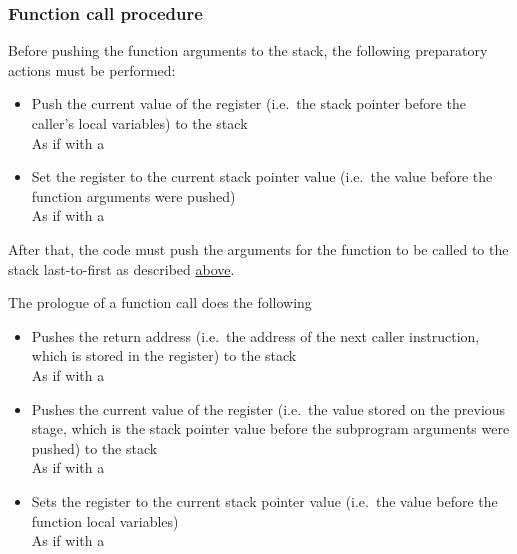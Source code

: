 \hypertarget{functions:call}{
    \subsubsection{Function call procedure}
}

\vspace{-0.2cm}

\hypertarget{functions:prep}{}
Before pushing the function arguments to the stack, the following
preparatory actions must be performed:

\begin{itemize}
    \item Push the current value of the  register
    (i.e.\ the stack pointer before the caller's local variables)
    to the stack \\
    As if with a \hspace{-0.1cm}

    \item Set the  register to the current stack pointer value
    (i.e.\ the value before the function arguments were pushed)\\
    As if with a \hspace{-0.1cm}
\end{itemize}

After that, the code must push the arguments for the function to be called
to the stack last-to-first as described \hyperlink{karma:call:basic}{above}.

\hypertarget{functions:prologue}{}
The prologue of a function call does the following

\begin{itemize}
    \item Pushes the return address (i.e.\ the address of the next
    caller instruction, which is stored in the  register)
    to the stack \\
    As if with a \hspace{-0.1cm}

    \item Pushes the current value of the  register (i.e.\ the value
    stored on the previous stage, which is the stack pointer value
    before the subprogram arguments were pushed) to the stack \\
    As if with a \hspace{-0.1cm}

    \item Sets the  register to the current stack pointer value
    (i.e.\ the value before the function local variables) \\
    As if with a \hspace{-0.1cm}
\end{itemize}
